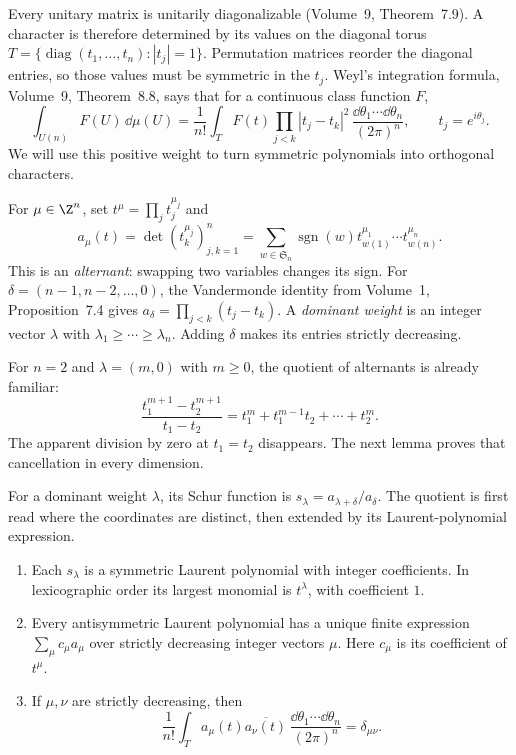 Every unitary matrix is unitarily diagonalizable (Volume~9, Theorem~7.9). A character is therefore determined by its values on the diagonal torus
$T=\{\operatorname{diag}(t_1,\ldots,t_n):|t_j|=1\}$.
Permutation matrices reorder the diagonal entries, so those values must be symmetric in the $t_j$. Weyl's integration formula, Volume~9, Theorem~8.8, says that for a continuous class function $F$,
\[
\int_{U(n)}F(U)\,\dd\mu(U)
=\frac1{n!}\int_T F(t)\prod_{j<k}|t_j-t_k|^2\,
\frac{\dd\theta_1\cdots\dd\theta_n}{(2\pi)^n},
\qquad t_j=e^{i\theta_j}.
\]
We will use this positive weight to turn symmetric polynomials into orthogonal characters.

For $\mu\in\Z^n$, set $t^\mu=\prod_jt_j^{\mu_j}$ and
\[
a_\mu(t)=\det(t_k^{\mu_j})_{j,k=1}^n
=\sum_{w\in\mathfrak S_n}\operatorname{sgn}(w)
 t_{w(1)}^{\mu_1}\cdots t_{w(n)}^{\mu_n}.
\]
This is an \emph{alternant}: swapping two variables changes its sign.
For $\delta=(n-1,n-2,\ldots,0)$, the Vandermonde identity from Volume~1, Proposition~7.4 gives
$a_\delta=\prod_{j<k}(t_j-t_k)$.
A \emph{dominant weight} is an integer vector $\lambda$ with
$\lambda_1\ge\cdots\ge\lambda_n$. Adding $\delta$ makes its entries strictly decreasing.

For $n=2$ and $\lambda=(m,0)$ with $m\ge0$, the quotient of alternants is already familiar:
\[
\frac{t_1^{m+1}-t_2^{m+1}}{t_1-t_2}
=t_1^m+t_1^{m-1}t_2+\cdots+t_2^m.
\]
The apparent division by zero at $t_1=t_2$ disappears. The next lemma proves that cancellation in every dimension.

\begin{definition}\label{def:schurpoly}
For a dominant weight $\lambda$, its Schur function is
$s_\lambda=a_{\lambda+\delta}/a_\delta$.
The quotient is first read where the coordinates are distinct, then extended by its Laurent-polynomial expression.
\end{definition}

\begin{lemma}\label{lem:alternants}
\begin{enumerate}[label=(\alph*)]
\item Each $s_\lambda$ is a symmetric Laurent polynomial with integer coefficients. In lexicographic order its largest monomial is $t^\lambda$, with coefficient $1$.
\item Every antisymmetric Laurent polynomial has a unique finite expression $\sum_\mu c_\mu a_\mu$ over strictly decreasing integer vectors $\mu$. Here $c_\mu$ is its coefficient of $t^\mu$.
\item If $\mu,\nu$ are strictly decreasing, then
\[
\frac1{n!}\int_T a_\mu(t)\overline{a_\nu(t)}\,
\frac{\dd\theta_1\cdots\dd\theta_n}{(2\pi)^n}
=\delta_{\mu\nu}.
\]
\end{enumerate}
\end{lemma}

